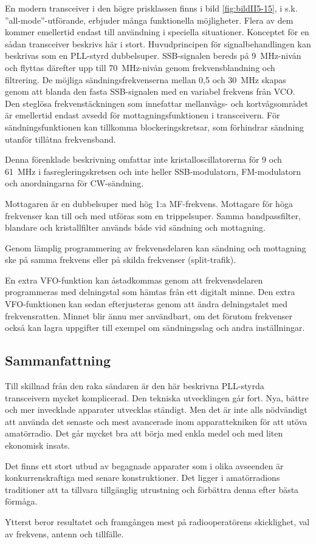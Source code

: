En modern transceiver i den högre prisklassen finns i bild \ref{fig:bildII5-15},
i s.k. ''all-mode''-utförande, erbjuder många funktionella möjligheter.
Flera av dem kommer emellertid endast till användning i speciella situationer.
Konceptet för en sådan transceiver beskrivs här i stort.
Huvudprincipen för signalbehandlingen kan beskrivas som en PLL-styrd
dubbelsuper.
SSB-signalen bereds på 9~MHz-nivån och flyttas därefter upp till
70~MHz-nivån genom frekvensblandning och filtrering.
De möjliga sändningsfrekvenserna mellan 0,5 och 30~MHz skapas genom att
blanda den fasta SSB-signalen med en variabel frekvens från VCO.
Den steglösa frekvenstäckningen som innefattar mellanvågs- och kortvågsområdet
är emellertid endast avsedd för mottagningsfunktionen i transceivern.
För sändningsfunktionen kan tillkomma blockeringskretsar, som förhindrar
sändning utanför tillåtna frekvensband.

Denna förenklade beskrivning omfattar inte kristalloscillatorerna för
9 och 61~MHz i fasregleringskretsen och inte heller SSB-modulatorn,
FM-modulatorn och anordningarna för CW-sändning.

Mottagaren är en dubbelsuper med hög 1:a MF-frekvens.
Mottagare för höga frekvenser kan till och med utföras som en trippelsuper.
Samma bandpassfilter, blandare och kristallfilter används både vid sändning
och mottagning.

Genom lämplig programmering av frekvensdelaren kan sändning och
mottagning ske på samma frekvens eller på skilda frekvenser
(split-trafik).

En extra VFO-funktion kan åstadkommas genom att frekvensdelaren
programmeras med delningstal som hämtas från ett digitalt minne.
Den extra VFO-funktionen kan sedan efterjusteras genom att ändra
delningstalet med frekvensratten.
Minnet blir ännu mer användbart, om det förutom frekvenser också kan lagra
uppgifter till exempel om sändningsslag och andra inställningar.

\subsection{Sammanfattning}

Till skillnad från den raka sändaren är den här beskrivna PLL-styrda
transceivern mycket komplicerad.
Den tekniska utvecklingen går fort.
Nya, bättre och mer invecklade apparater utvecklas ständigt.
Men det är inte alls nödvändigt att använda det senaste och mest
avancerade inom apparattekniken för att utöva amatörradio.
Det går mycket bra att börja med enkla medel och med liten ekonomisk insats.

Det finns ett stort utbud av begagnade apparater som i olika avseenden
är konkurrenskraftiga med senare konstruktioner.
Det ligger i amatörradions traditioner att ta tillvara tillgänglig
utrustning och förbättra denna efter bästa förmåga.

Ytterst beror resultatet och framgången mest på radiooperatörens
skicklighet, val av frekvens, antenn och tillfälle.
